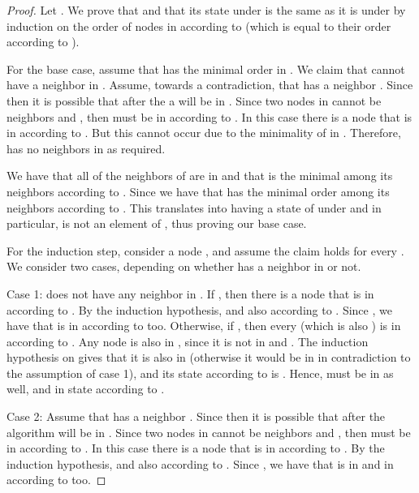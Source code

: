 \begin{proof}
Let . We prove that  and that its state under  is the same as it is under  by induction on the order of nodes in  according to  (which is equal to their order according to ).



For the base case, assume that  has the minimal order in .
We claim that  cannot have a neighbor in .
Assume, towards a contradiction, that  has a neighbor . Since  then it is possible that after the a  will be in . Since two nodes in  cannot be neighbors and , then  must be in  according to . In this case there is a node  that is in  according to . But this cannot occur due to the minimality of  in . Therefore,  has no neighbors in  as required.

We have that all of the neighbors of  are in  and that  is the minimal among its neighbors according to . Since  we have that  has the minimal order among its neighbors according to . This translates into  having a state of  under  and in particular,  is not an element of , thus proving our base case.


For the induction step, consider a node , and assume the claim holds for every . We consider two cases, depending on whether  has a neighbor in  or not.

Case 1:   does not have any neighbor in .
If , then there is a node  that is in  according to . By the induction hypothesis,  and  also according to . Since , we have that  is in  according to  too.
Otherwise, if , then every  (which is also ) is in  according to .
Any node  is also in , since it is not in  and . The induction hypothesis on  gives that it is also in  (otherwise it would be in  in contradiction to the assumption of case 1), and its state according to  is . Hence,  must be in  as well, and in state  according to .


Case 2: Assume that  has a neighbor . Since  then it is possible that after the algorithm  will be in . Since two nodes in  cannot be neighbors and , then  must be in  according to . In this case there is a node  that is in  according to . By the induction hypothesis,  and  also according to . Since , we have that  is in  and in  according to  too.
\end{proof}


